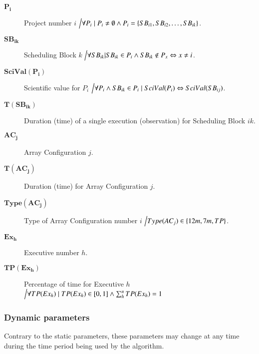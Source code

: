 \begin{description}
\item[$\mathbf{P_i}$] Project number $i$ $\Big\slash \forall P_i \mid P_i \neq \emptyset \land P_i = \{SB_{i1}, SB_{i2}, \ldots, SB_{ik}\}$.

\item[$\mathbf{SB_{ik}}$] Scheduling Block $k$ $\Big\slash \forall SB_{ik} | SB_{ik} \in P_i \land SB_{ik} \notin P_x \Leftrightarrow x \neq i$.

\item[$\mathbf{SciVal(P_i)}$] Scientific value for $P_i$ $\Big\slash \forall P_i \land SB_{ik} \in P_i \mid SciVal(P_i) \Leftrightarrow SciVal(SB_{ij}) $.

\item[$\mathbf{T(SB_{ik})}$] Duration (time) of a single execution (observation) for Scheduling Block $ik$.

\item[$\mathbf{AC_j}$] Array Configuration $j$.

\item[$\mathbf{T(AC_j)}$] Duration (time) for Array Configuration $j$.

\item[$\mathbf{Type(AC_j)}$] Type of Array Configuration number $i$ $\Big\slash Type(AC_j) \in \{12m, 7m, TP\}$.

\item[$\mathbf{Ex_h}$] Executive number $h$.

\item[$\mathbf{TP(Ex_h)}$] Percentage of time for Executive $h$ $\Big\slash \forall TP(Ex_h) \mid TP(Ex_h) \in {[0,1]} \land \sum_{h}^{n} TP(Ex_h) = 1$ 

\end{description} 

\subsubsection{Dynamic parameters}
Contrary to the static parameters, these parameters may change at any time during the time period being used by the algorithm.

